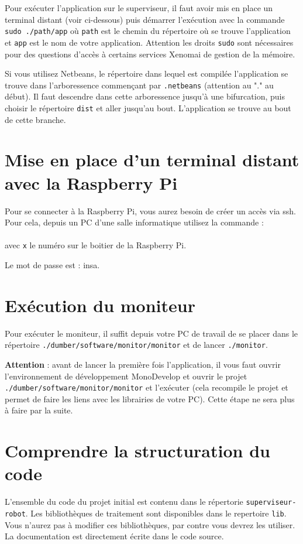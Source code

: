 \documentclass[11pt]{paper}
\newcommand{\raspi}{Raspberry Pi\xspace}
\begin{document}
Pour exécuter l'application sur le superviseur, il faut avoir mis en place un terminal distant (voir ci-dessous) puis démarrer l'exécution avec la commande {\tt sudo ./path/app} où {\tt path} est le chemin du répertoire où se trouve l'application et {\tt app} est le nom de votre application. Attention les droits {\tt sudo} sont nécessaires pour des questions d'accès à certains services Xenomai de gestion de la mémoire.

Si vous utilisez Netbeans, le répertoire dans lequel est compilée l'application se trouve dans l'arboressence commençant par {\tt .netbeans} (attention au "." au début). Il faut descendre dans cette arboressence jusqu'à une bifurcation, puis choisir le répertoire {\tt dist} et aller jusqu'au bout. L'application se trouve au bout de cette branche.


\section{Mise en place d'un terminal distant avec la \raspi}
\label{sec:ssh}

Pour se connecter à la \raspi, vous aurez besoin de créer un accès via ssh. Pour cela, depuis un PC d'une salle informatique utilisez la commande :\\ \indent{}\\
avec {\tt x} le numéro sur le boitier de la \raspi.

Le mot de passe est : insa.


\section{Exécution du moniteur}
\label{sec:utilisation}

Pour exécuter le moniteur, il suffit depuis votre PC de travail de se placer dans le répertoire {\tt ./dumber/software/monitor/monitor} et de lancer {\tt ./monitor}.

{\bf Attention} : avant de lancer la première fois l'application, il vous faut ouvrir l'environnement de développement MonoDevelop et ouvrir le projet {\tt ./dumber/software/monitor/monitor}  et l'exécuter (cela recompile le projet et permet de faire les liens avec les librairies de votre PC). Cette étape ne sera plus à faire par la suite.


\section{Comprendre la structuration du code}
\label{sec:code}
 L'ensemble du code du projet initial est contenu dans le répertorie {\tt superviseur-robot}. Les bibliothèques de traitement sont disponibles dans le repertoire {\tt lib}. Vous n'aurez pas à modifier ces bibliothèques, par contre vous devrez les utiliser. La documentation est directement écrite dans le code source.
 
\end{document}
